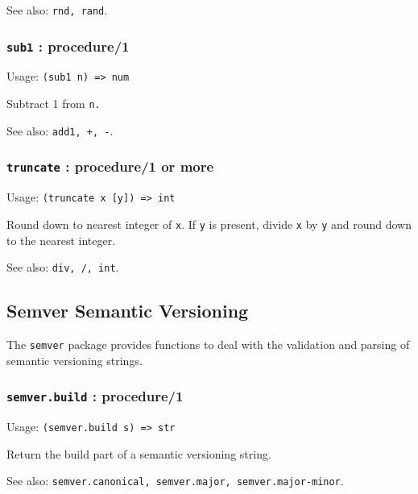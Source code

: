 \documentclass[
]{article}
\newcommand{\passthrough}[1]{#1}
\begin{document}
See also: \passthrough{\lstinline!rnd, rand!}.

\hypertarget{sub1-procedure1}{%
\subsubsection{\texorpdfstring{\texttt{sub1} :
procedure/1}{sub1 : procedure/1}}\label{sub1-procedure1}}

Usage: \passthrough{\lstinline!(sub1 n) => num!}

Subtract 1 from \passthrough{\lstinline!n.!}

See also: \passthrough{\lstinline!add1, +, -!}.

\hypertarget{truncate-procedure1-or-more}{%
\subsubsection{\texorpdfstring{\texttt{truncate} : procedure/1 or
more}{truncate : procedure/1 or more}}\label{truncate-procedure1-or-more}}

Usage: \passthrough{\lstinline!(truncate x [y]) => int!}

Round down to nearest integer of \passthrough{\lstinline!x!}. If
\passthrough{\lstinline!y!} is present, divide
\passthrough{\lstinline!x!} by \passthrough{\lstinline!y!} and round
down to the nearest integer.

See also: \passthrough{\lstinline!div, /, int!}.

\hypertarget{semver-semantic-versioning}{%
\subsection{Semver Semantic
Versioning}\label{semver-semantic-versioning}}

The \passthrough{\lstinline!semver!} package provides functions to deal
with the validation and parsing of semantic versioning strings.

\hypertarget{semver.build-procedure1}{%
\subsubsection{\texorpdfstring{\texttt{semver.build} :
procedure/1}{semver.build : procedure/1}}\label{semver.build-procedure1}}

Usage: \passthrough{\lstinline!(semver.build s) => str!}

Return the build part of a semantic versioning string.

See also:
\passthrough{\lstinline!semver.canonical, semver.major, semver.major-minor!}.
\end{document}
